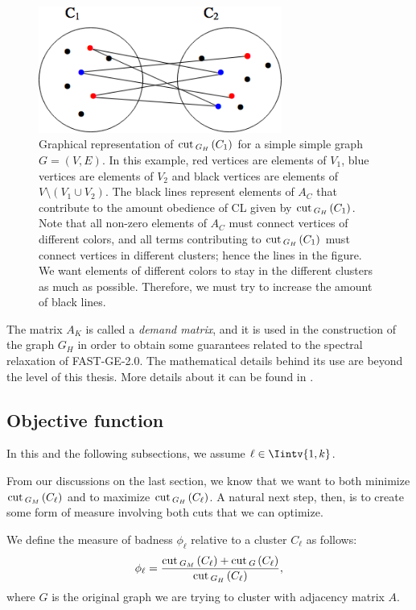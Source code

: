\begin{figure}
\begin{center}
\includegraphics[width=8cm]{figures/gh.png}
\end{center}
   \caption[Graphical representation of $\cut_{G_H\,}(C_1)$ for a simple graph $G=(V,E)$]{Graphical representation of $\cut _{G_H\,}(C_1)$ for a simple simple graph $G = (V,E)$.  In this example, red vertices are elements of $V_1$, blue vertices are elements of $V_2$ and black vertices are elements of $V \setminus (V_1 \cup V_2)$. The black lines represent elements of $A_C$ that contribute to the amount obedience of CL given by $\cut _{G_H\,}(C_1)$. Note that all non-zero elements of $A_C$ must connect vertices of different colors, and all terms contributing to $\cut _{G_H\,}(C_1)$ must connect vertices in different clusters; hence the lines in the figure. We want elements of different colors to stay in the different clusters as much as possible. Therefore, we must try to increase the amount of black lines.}
\label{gh}
\end{figure}

The matrix $A_K$ is called a \textit{demand matrix}, and it is used in the construction of the graph $G_H$ in order to obtain some guarantees related to the spectral relaxation of FAST-GE-2.0. 
The mathematical details behind its use are beyond the level of this thesis.
More details about it can be found in \cite{fastge1}.


\subsection{Objective function}
In this and the following subsections, we assume $\ell \in \Iintv{1,k}$.

From our discussions on the last section, we know that we want to both minimize $\operatorname{cut\,} _{G_M\,}(C_{\ell})$ and to maximize $\operatorname{cut\,} _{G_H\,}(C_{\ell})$.
A natural next step, then, is to create some form of measure involving both cuts that we can optimize.

\begin{definition}
  We define the measure of badness $\phi_\ell$ relative to a cluster $C_\ell$ as follows:
   \begin{equation}
      \phi_\ell = \frac{\operatorname{cut\,}_{G_M\,} (C_\ell) + \operatorname{cut\,}_{G\,}(C_\ell)}{\operatorname{cut\,}_{G_H\,}(C_\ell)},
   \end{equation}
   where $G$ is the original graph we are trying to cluster with adjacency matrix $A$.
\end{definition}

